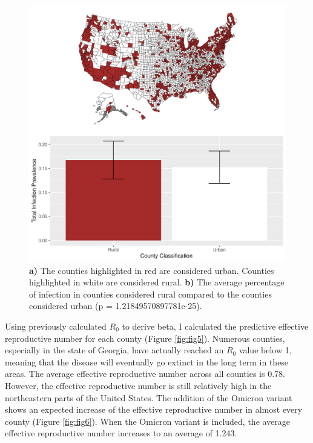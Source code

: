 \documentclass[
  12pt,
]{article}
\begin{document}
\begin{figure}[H]

{\centering \includegraphics{Final-Manuscript_files/figure-latex/fig4-1} 

}

\caption{\textbf{a)} The counties highlighted in red are considered urban. Counties highlighted in white are considered rural. \textbf{b)} The average percentage of infection in counties considered rural compared to the counties considered urban (p = 1.21849570897781e-25).}\label{fig:fig4}
\end{figure}

Using previously calculated \(R_0\) to derive beta, I calculated the predictive effective reproductive number for each county (Figure \ref{fig:fig5}). Numerous counties, especially in the state of Georgia, have actually reached an \(R_0\) value below 1, meaning that the disease will eventually go extinct in the long term in these areas. The average effective reproductive number across all counties is 0.78. However, the effective reproductive number is still relatively high in the northeastern parts of the United States. The addition of the Omicron variant shows an expected increase of the effective reproductive number in almost every county (Figure \ref{fig:fig6}). When the Omicron variant is included, the average effective reproductive number increases to an average of 1.243.
\end{document}
